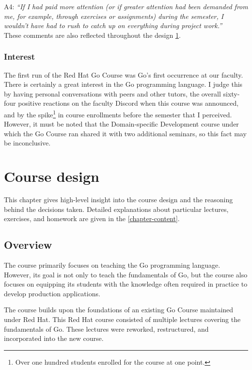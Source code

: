 \documentclass[
  digital,
  color,
  oneside,
  nosansbold,
  nocolorbold,
  nolof,
  nolot,
]{fithesis4}
\begin{document}
\noindent
A4: \textit{\enquote{If I had paid more attention (or if greater attention had been demanded from me, for example, through exercises or assignments) during the semester, I wouldn't have had to rush to catch up on everything during project work.}} \\

\noindent
These comments are also reflected throughout the design \cref{chapter-design}.

\subsection{Interest}

The first run of the Red Hat Go Course was Go's first occurrence at our faculty. There is certainly a great interest in the Go programming language. I judge this by having personal conversations with peers and other tutors, the overall sixty-four positive reactions on the faculty Discord when this course was announced, and by the spike\footnote{Over one hundred students enrolled for the course at one point.}
in course enrollments before the semester that I perceived. However, it must be noted that the Domain-specific Development course under which the Go Course ran shared it with two additional seminars, so this fact may be inconclusive.

\chapter{Course design}\label{chapter-design}

This chapter gives high-level insight into the course design and the reasoning behind the decisions taken. Detailed explanations about particular lectures, exercises, and homework are given in the \cref{chapter-content}.

\section{Overview}\label{design-overview}

The course primarily focuses on teaching the Go programming language. However, its goal is not only to teach the fundamentals of Go, but the course also focuses on equipping its students with the knowledge often required in practice to develop production applications.

The course builds upon the foundations of an existing Go Course maintained under Red Hat\cite{redhat-go-course}. This Red Hat course consisted of multiple lectures covering the fundamentals of Go. These lectures were reworked, restructured, and incorporated into the new course.
\end{document}
